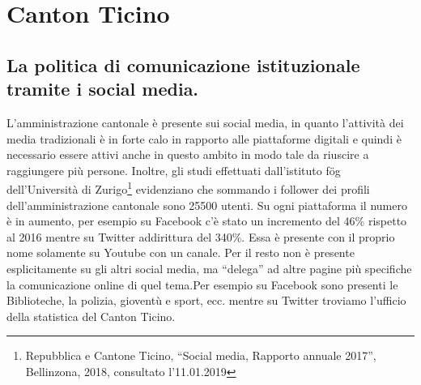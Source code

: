 \section{Canton Ticino}
\subsection{La politica di comunicazione istituzionale tramite i social media.}
L’amministrazione cantonale è presente sui social media, in quanto l’attività dei media tradizionali è in forte calo in rapporto alle piattaforme digitali e quindi è necessario essere attivi anche in questo ambito in modo tale da riuscire a raggiungere più persone. Inoltre, gli studi effettuati dall’istituto fög dell’Università di Zurigo\footnote{Repubblica e Cantone Ticino, “Social media, Rapporto annuale 2017”, Bellinzona, 2018, consultato l’11.01.2019} evidenziano che sommando i follower dei profili dell’amministrazione cantonale sono 25500 utenti. Su ogni piattaforma il numero è in aumento, per esempio su Facebook c’è stato un incremento del 46\% rispetto al 2016 mentre su Twitter addirittura del 340\%. Essa è presente con il proprio nome solamente su Youtube con un canale. Per il resto non è presente esplicitamente su gli altri social media, ma “delega” ad altre pagine più specifiche la comunicazione online di quel tema.Per esempio su Facebook sono presenti le Biblioteche, la polizia, gioventù e sport, ecc. mentre su Twitter troviamo l’ufficio della statistica del Canton Ticino. 
